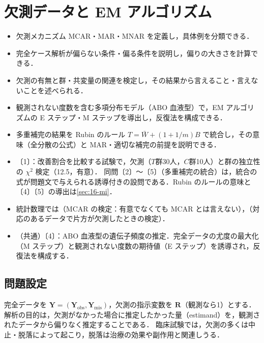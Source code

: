 \chapter{欠測データと EM アルゴリズム}\label{ch:16}

\begin{goalbox}
\begin{itemize}
\item 欠測メカニズム MCAR・MAR・MNAR を定義し，具体例を分類できる．
\item 完全ケース解析が偏らない条件・偏る条件を説明し，偏りの大きさを計算できる．
\item 欠測の有無と群・共変量の関連を検定し，その結果から言えること・言えないことを述べられる．
\item 観測されない度数を含む多項分布モデル（ABO 血液型）で，EM アルゴリズムの E ステップ・M ステップを導出し，反復法を構成できる．
\item 多重補完の結果を Rubin のルール $T=\bar W+(1+1/m)B$ で統合し，その意味（全分散の公式）と MAR・適切な補完の前提を説明できる．
\end{itemize}
\end{goalbox}

\begin{exambox}
\begin{itemize}
\item {}〔1〕：改善割合を比較する試験で，欠測（$T$群30人，$C$群10人）と群の独立性の $\chi^2$ 検定（12.5，有意）．
      同問〔2〕〜〔5〕（多重補完の統合）は，統合の式が問題文で与えられる誘導付きの設問である．Rubin のルールの意味と〔4〕〔5〕の導出は\cref{sec:16-mi}．
\item 統計数理では（MCAR の検定：有意でなくても MCAR とは言えない），（対応のあるデータで片方が欠測したときの検定）．
\item {}（共通）〔4〕：ABO 血液型の遺伝子頻度の推定．完全データの尤度の最大化（M ステップ）と観測されない度数の期待値（E ステップ）を誘導され，反復法を構成する．
\end{itemize}
\end{exambox}


\section{問題設定}\label{sec:16-setting}
完全データを $\bm Y=(\bm Y_{\mathrm{obs}},\bm Y_{\mathrm{mis}})$，欠測の指示変数を $\bm R$（観測なら1）とする．
解析の目的は，欠測がなかった場合に推定したかった量（estimand）を，観測されたデータから偏りなく推定することである．
臨床試験では，欠測の多くは中止・脱落によって起こり，脱落は治療の効果や副作用と関連しうる．

